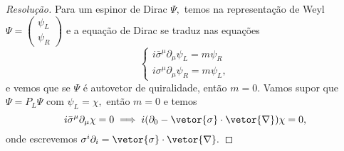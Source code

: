 \begin{proof}[Resolução]
    Para um espinor de Dirac \(\Psi,\) temos na representação de Weyl \(\Psi = \left(\begin{smallmatrix}\psi_L\\\psi_R
    \end{smallmatrix}\right)\) e a equação de Dirac se traduz nas equações
    \begin{equation*}
        \begin{cases}
            i \bar{\sigma}^\mu \partial_\mu \psi_L = m\psi_R\\
            i \sigma^\mu\partial_\mu\psi_R= m \psi_L,
        \end{cases}
    \end{equation*}
    e vemos que se \(\Psi\) é autovetor de quiralidade, então \(m = 0.\) Vamos supor que \(\Psi = P_L \Psi\) com \(\psi_L = \chi,\) então \(m = 0\) e temos
    \begin{equation*}
        i \bar{\sigma}^\mu \partial_\mu \chi = 0 
        \implies i(\partial_0 - \vetor{\sigma}\cdot\vetor{\nabla})\chi = 0,
    \end{equation*}
    onde escrevemos \(\sigma^i \partial_i = \vetor{\sigma} \cdot \vetor{\nabla}.\) 


\end{proof}
